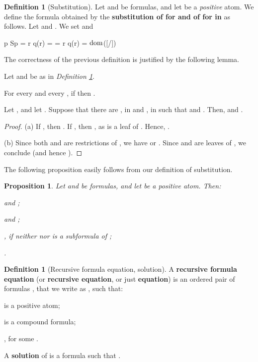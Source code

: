 \documentclass[copyright,creativecommons]{eptcs}
\newcommand{\bF}{\mathbf{F}}
\newcommand{\bG}{\mathbf{G}}
\newcommand{\bbv}{\mathbf{v}}
\newcommand{\dom}{\ensuremath{\textnormal{dom}}}
\newtheorem{proposition}[theorem]{Proposition}
\theoremstyle{definition}
\newtheorem{Definition}[theorem]{Definition}
\newcommand{\squishlist}{
 \begin{list}{}
  { \setlength{\itemsep}{0pt}
     \setlength{\parsep}{3pt}
     \setlength{\topsep}{3pt}
     \setlength{\partopsep}{0pt}
     \setlength{\leftmargin}{1em}
     \setlength{\labelwidth}{1.5em}
     \setlength{\labelsep}{0.5em} } }
\newcommand{\squishend}{
  \end{list}  }
\newcommand{\sqi}{
 \begin{list}{}
  { \setlength{\itemsep}{0pt}
     \setlength{\parsep}{3pt}
     \setlength{\topsep}{3pt}
     \setlength{\partopsep}{0pt}
     \setlength{\leftmargin}{1.4em}
     \setlength{\labelwidth}{1.5em}
     \setlength{\labelsep}{0.3em} } }
\newcommand{\sqe}{
  \end{list}  }
\begin{document}
\begin{Definition}[Substitution] \label{subdef}
Let  and  be  formulas, and let  be a
\emph{positive} atom.
We define the formula 
obtained by the \textbf{substitution of  for  and
of  for  in } as follows.
Let 
and .
We set  and

\squishlist
\item[]
{\centering
 p \in Sp = r \star q\bF(r) = \bbvp = r \star q\bF(r) = \neg \bbvp \in \dom(\bF[\bG/\bbv])

\vspace{-0.53cm}
\hfill \par}
\squishend
\end{Definition}
The correctness of the previous definition is justified by the following lemma.

\begin{lemma} \label{lemsub}
Let  \/\@ and \/\@ be as in \emph{Definition \ref{subdef}}.
\sqi
\item[\emph{(a)}]
For every \/\@ and every  \/\@, if \/\@  then  \/\@.
\item[\emph{(b)}]  Let  \/\@, and let   \/\@.
Suppose that  there are  \/\@,  \/ in \/\@ and    \/\@,   \/ in  \/\@ such that  \/\@ and \/\@.
Then, \/\@ and \/\@.

\sqe
\end{lemma}
\begin{proof}
(a)
If , then .
If , then ,  as  is a leaf of . Hence, .

(b)   Since   both  and 
are restrictions of ,  we have
 or .
 Since   and  are leaves of ,
we conclude   (and  hence ).  \end{proof}
The following proposition easily follows from our definition of substitution.

\begin{proposition} \label{subst} Let  \/\@ and \/\@ be  formulas, and
let \/\@  be a positive atom. Then:
\squishlist
\item[ \emph{(1)}]
\@ and  \/;
\item[ \emph{(2)}] \@ and
\/\@;
\item[ \emph{(3)}] \@,  if neither \/\@ nor \/\@ is a subformula of  \/\@;
\item[ \emph{(4)}]
\@. \hfill 
\squishend
\end{proposition}





\begin{Definition}[Recursive formula equation, solution] \label{receq}
A \textbf{recursive formula equation} (or  \textbf{recursive  equation}, or just \textbf{equation}) is an ordered  pair of formulas
, that we write as ,  such that: \squishlist
\item[ (R)]  is a positive atom;
\item[ (R)]   is  a compound formula;
\item[ (R)] ,  for some .
\squishend
 A \textbf{solution} of   is a formula  such that  .
\hfill 
\end{Definition}
\end{document}
